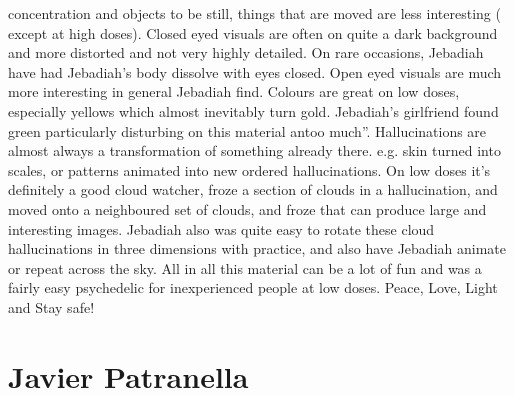 \documentclass[12pt]{book}
\begin{document}
concentration and objects to be still, things that are moved are less interesting ( except at high doses). Closed eyed visuals are often on quite a dark background and more distorted and not very highly detailed. On rare occasions, Jebadiah have had Jebadiah's body dissolve with eyes closed. Open eyed visuals are much more interesting in general Jebadiah find. Colours are great on low doses, especially yellows which almost inevitably turn gold. Jebadiah's girlfriend found green particularly disturbing on this material antoo much''. Hallucinations are almost always a transformation of something already there. e.g. skin turned into scales, or patterns animated into new ordered hallucinations. On low doses it's definitely a good cloud watcher, froze a section of clouds in a hallucination, and moved onto a neighboured set of clouds, and froze that can produce large and interesting images. Jebadiah also was quite easy to rotate these cloud hallucinations in three dimensions with practice, and also have Jebadiah animate or repeat across the sky. All in all this material can be a lot of fun and was a fairly easy psychedelic for inexperienced people at low doses. Peace, Love, Light and Stay safe!



\chapter{Javier Patranella}
\end{document}
